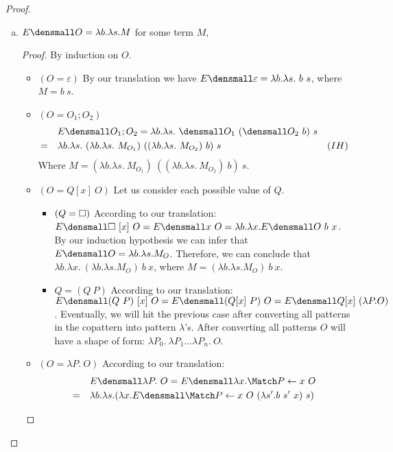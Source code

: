 \begin{proof}
\begin{enumerate}[(a)]
\begin{proof}
\begin{itemize}
            \end{itemize}
            \qed
        \end{proof}
\item $E\den{O} = \lambda b. \lambda s. M$ for some term $M$,
\begin{proof}
    By induction on $O$.
    \begin{itemize}
    \item $(O = \varepsilon)$ By our translation we have $E\den{\varepsilon} = \lambda b. \lambda s. ~b ~s$, where $M= b ~s$.
    \item $(O = O_1;O_2)$
        \begin{align*}
            & \quad E\den{O_1;O_2} = \lambda b. \lambda s. ~\den{O_1} ~(\den{O_2} ~b) ~s\\
            =& \quad \lambda b. \lambda s. ~(\lambda b. \lambda s. ~M_{O_1}) ~((\lambda b. \lambda s. ~M_{O_2}) ~b) ~s & (IH)
        \end{align*}
        Where $M=(\lambda b. \lambda s. ~M_{O_1}) ~((\lambda b. \lambda s. ~M_{O_2}) ~b) ~s$.
    \item $(O = Q[x] ~O)$ Let us consider each possible value of $Q$.
        \begin{itemize}
            \item $(Q=\square)$ According to our translation: $E\den{\hole ~ [x] ~O} = E\den{x ~O} = \lambda b. \lambda x. E\den{O} ~ b ~ x$.
            By our induction hypothesis we can infer that $E\den{O}=\lambda b. \lambda s. M_O$.
            Therefore, we can conclude that $\lambda b. \lambda x. ~(\lambda b. \lambda s. M_O) ~ b ~ x$, where $ M = (\lambda b. \lambda s. M_O) ~ b ~ x$.
            \item $Q=(Q ~P)$ According to our translation: $E\den{(Q ~P) ~ [x] ~O} = E\den{(Q[x] ~P) ~O} = E\den{Q[x] ~ (\lambda P. O)}$.
            Eventually, we will hit the previous case after converting all patterns in the copattern into pattern $\lambda$'s.
            After converting all patterns $O$ will have a shape of form: $\lambda P_0. ~\lambda P_1 ... \lambda P_n. ~O$.
        \end{itemize}
    \item $(O = \lambda P. ~O)$ According to our translation:
        \begin{align*} 
            & \quad E\den{\lambda P. ~O} = E\den{\lambda x. \Match P \gets x ~ O}\\
            =& \quad \lambda b. \lambda s. (\lambda x. E\den{\Match P \gets x ~ O} ~ (\lambda s'. b ~ s' ~ x) ~ s) \\

\end{align*}
\end{itemize}
\end{proof}
\end{enumerate}
\end{proof}
